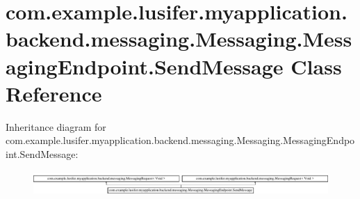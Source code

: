 \hypertarget{classcom_1_1example_1_1lusifer_1_1myapplication_1_1backend_1_1messaging_1_1_messaging_1_1_messaging_endpoint_1_1_send_message}{}\section{com.\+example.\+lusifer.\+myapplication.\+backend.\+messaging.\+Messaging.\+Messaging\+Endpoint.\+Send\+Message Class Reference}
\label{classcom_1_1example_1_1lusifer_1_1myapplication_1_1backend_1_1messaging_1_1_messaging_1_1_messaging_endpoint_1_1_send_message}
Inheritance diagram for com.\+example.\+lusifer.\+myapplication.\+backend.\+messaging.\+Messaging.\+Messaging\+Endpoint.\+Send\+Message\+:\begin{figure}[H]
\begin{center}
\leavevmode
\includegraphics[height=0.947547cm]{classcom_1_1example_1_1lusifer_1_1myapplication_1_1backend_1_1messaging_1_1_messaging_1_1_messaging_endpoint_1_1_send_message}
\end{center}
\end{figure}
